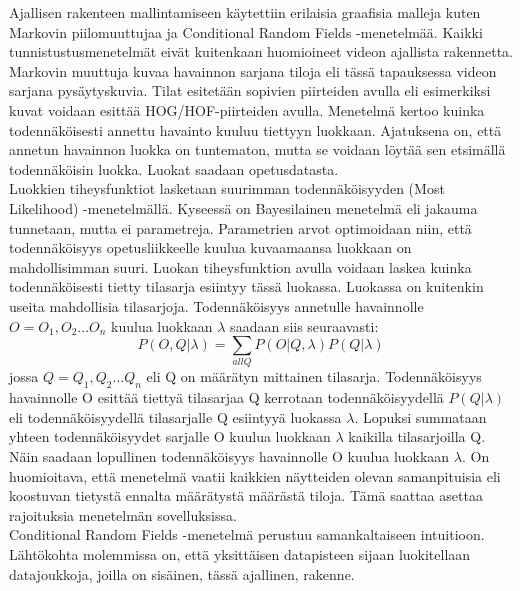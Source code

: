 Ajallisen rakenteen mallintamiseen käytettiin erilaisia graafisia malleja kuten Markovin piilomuuttujaa ja Conditional Random Fields -menetelmää.
Kaikki tunnistustusmenetelmät eivät kuitenkaan huomioineet videon ajallista rakennetta. \citep {6239178}\\ 

Markovin muuttuja kuvaa havainnon sarjana tiloja eli tässä tapauksessa videon sarjana pysäytyskuvia. 
Tilat esitetään sopivien piirteiden avulla eli esimerkiksi kuvat voidaan esittää HOG/HOF-piirteiden avulla. 
Menetelmä kertoo kuinka todennäköisesti annettu havainto kuuluu tiettyyn luokkaan. 
Ajatuksena on, että annetun havainnon luokka on tuntematon, mutta se voidaan löytää sen etsimällä todennäköisin luokka. 
Luokat saadaan opetusdatasta.\\

Luokkien tiheysfunktiot lasketaan suurimman todennäköisyyden
(Most Likelihood) -menetelmällä. Kyseessä on Bayesilainen menetelmä eli jakauma tunnetaan, mutta ei parametreja.
Parametrien arvot optimoidaan niin, että todennäköisyys opetusliikkeelle kuulua kuvaamaansa luokkaan on mahdollisimman suuri.
Luokan tiheysfunktion avulla voidaan laskea kuinka todennäköisesti tietty tilasarja esiintyy tässä luokassa.
Luokassa on kuitenkin useita mahdollisia tilasarjoja. Todennäköisyys annetulle havainnolle $O = O_{1}, O_{2}...O_{n}$ kuulua 
luokkaan $\lambda$ saadaan siis seuraavasti:
\begin{equation}
P(O,Q|\lambda) = \sum\limits_{all Q}P(O|Q, \lambda)P(Q|\lambda)
\end{equation}
jossa $Q = Q_{1}, Q_{2} ... Q_{n}$ eli Q on määrätyn mittainen tilasarja. Todennäköisyys havainnolle O esittää
tiettyä tilasarjaa Q kerrotaan todennäköisyydellä $P(Q|\lambda)$ eli todennäköisyydellä tilasarjalle Q esiintyyä luokassa $\lambda$. 
Lopuksi summataan yhteen todennäköisyydet sarjalle O kuulua luokkaan $\lambda$ kaikilla tilasarjoilla Q. 
Näin saadaan lopullinen todennäköisyys havainnolle O kuulua luokkaan $\lambda$. On huomioitava, että menetelmä vaatii
kaikkien näytteiden olevan samanpituisia eli koostuvan tietystä ennalta määrätystä määrästä tiloja. Tämä saattaa asettaa
rajoituksia menetelmän sovelluksissa.\citep {18626}\\

Conditional Random Fields -menetelmä perustuu samankaltaiseen intuitioon. \citep {1315232} Lähtökohta molemmissa on, että yksittäisen 
datapisteen sijaan luokitellaan datajoukkoja, joilla on sisäinen, tässä ajallinen, rakenne.\\

